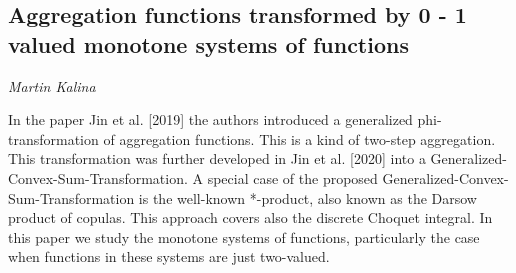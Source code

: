 \documentclass[../booklet.tex]{subfiles}
\begin{document}
\subsection[Aggregation functions transformed by 0 - 1 valued monotone systems of  functions. {\it Martin Kalina}]{Aggregation functions transformed by 0 - 1 valued monotone systems of  functions}

\begin{center}
  {\it Martin Kalina}
\end{center}



In the paper  Jin et al. [2019] the authors introduced a generalized phi-transformation of aggregation functions. This is a kind of two-step aggregation. This transformation was further developed in  Jin et al. [2020] into a Generalized-Convex-Sum-Transformation. A special case of the proposed  Generalized-Convex-Sum-Transformation is the well-known *-product, also known as the Darsow product of copulas. This approach covers also the discrete Choquet integral. In this paper we  study the monotone systems of functions, particularly the case when functions in these systems are just two-valued.

	
\end{document}
